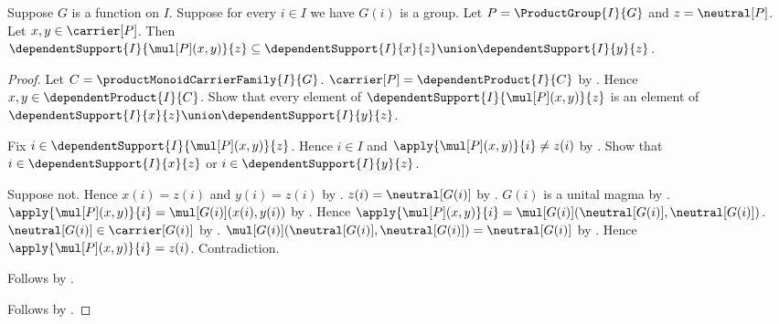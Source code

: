 \begin{proposition}\label{product_group_mul_support}
    Suppose $G$ is a function on $I$.
    Suppose for every $i\in I$ we have $G(i)$ is a group.
    Let $P=\ProductGroup{I}{G}$ and $z=\neutral[P]$.
    Let $x,y\in\carrier[P]$.
    Then
        $\dependentSupport{I}{\mul[P](x,y)}{z}\subseteq
            \dependentSupport{I}{x}{z}\union
                \dependentSupport{I}{y}{z}$.
\end{proposition}
\begin{proof}
    Let $C=\productMonoidCarrierFamily{I}{G}$.
    $\carrier[P]=\dependentProduct{I}{C}$ by
        .
    Hence $x,y\in\dependentProduct{I}{C}$.
    Show that every element of
        $\dependentSupport{I}{\mul[P](x,y)}{z}$ is an element of
        $\dependentSupport{I}{x}{z}\union
            \dependentSupport{I}{y}{z}$.
    \begin{subproof}
        Fix $i\in\dependentSupport{I}{\mul[P](x,y)}{z}$.
        Hence $i\in I$ and
            $\apply{\mul[P](x,y)}{i}\neq z(i)$ by
            .
        Show that $i\in\dependentSupport{I}{x}{z}$ or
            $i\in\dependentSupport{I}{y}{z}$.
        \begin{subproof}
            Suppose not.
            Hence $x(i)=z(i)$ and $y(i)=z(i)$ by
                .
            $z(i)=\neutral[G(i)]$ by
                .
            $G(i)$ is a unital magma by
                .
            $\apply{\mul[P](x,y)}{i}
                =\mul[G(i)](x(i),y(i))$ by
                .
            Hence $\apply{\mul[P](x,y)}{i}
                =\mul[G(i)](\neutral[G(i)],\neutral[G(i)])$.
            $\neutral[G(i)]\in\carrier[G(i)]$ by
                .
            $\mul[G(i)](\neutral[G(i)],\neutral[G(i)])
                =\neutral[G(i)]$ by .
            Hence $\apply{\mul[P](x,y)}{i}=z(i)$.
            Contradiction.
        \end{subproof}
        Follows by .
    \end{subproof}
    Follows by .
\end{proof}

